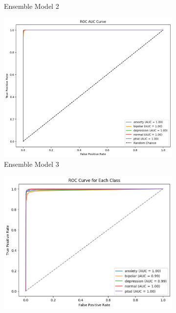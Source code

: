 \begin{figure}[h!]
\begin{subfigure}[b]{0.47\textwidth}
        \caption*{Ensemble Model 2}
        \label{em2 roc}  %
    \end{subfigure}
    \hfill
    \begin{subfigure}[b]{0.47\textwidth}
        \centering
        \includegraphics[width=\textwidth]{Images/EM3 ROC.png}
        \caption*{Ensemble Model 3}
        \label{em3 roc}  %
    \end{subfigure}
    \hfill
    \begin{subfigure}[b]{0.48\textwidth}
        \centering
        \includegraphics[width=\textwidth]{Images/BAG ROC.png}

\end{subfigure}
\end{figure}
